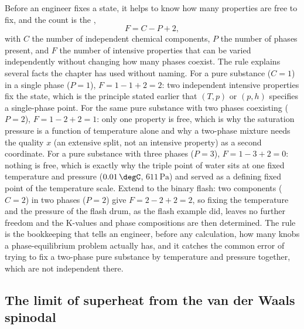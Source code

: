 Before an engineer fixes a state, it helps to know how many properties are
free to fix, and the count is the ,
\[
F = C - P + 2,
\]
with $C$ the number of independent chemical components, $P$ the number of
phases present, and $F$ the number of intensive properties that can be varied
independently without changing how many phases coexist. The rule explains
several facts the chapter has used without naming. For a pure substance
($C = 1$) in a single phase ($P = 1$), $F = 1 - 1 + 2 = 2$: two independent
intensive properties fix the state, which is the principle stated earlier
that $(T, p)$ or $(p, h)$ specifies a single-phase point. For the same pure
substance with two phases coexisting ($P = 2$), $F = 1 - 2 + 2 = 1$: only
one property is free, which is why the saturation pressure is a function of
temperature alone and why a two-phase mixture needs the quality $x$ (an
extensive split, not an intensive property) as a second coordinate. For a
pure substance with three phases ($P = 3$), $F = 1 - 3 + 2 = 0$: nothing is
free, which is exactly why the triple point of water sits at one fixed
temperature and pressure ($0.01\,\degC$, $611\,\text{Pa}$) and served as a
defining fixed point of the temperature scale. Extend to the binary flash:
two components ($C = 2$) in two phases ($P = 2$) give $F = 2 - 2 + 2 = 2$, so
fixing the temperature and the pressure of the flash drum, as the flash
example did, leaves no further freedom and the K-values and phase
compositions are then determined. The rule is the bookkeeping that tells an
engineer, before any calculation, how many knobs a phase-equilibrium problem
actually has, and it catches the common error of trying to fix a
two-phase pure substance by temperature and pressure together, which are not
independent there.

\subsection{The limit of superheat from the van der Waals spinodal}

